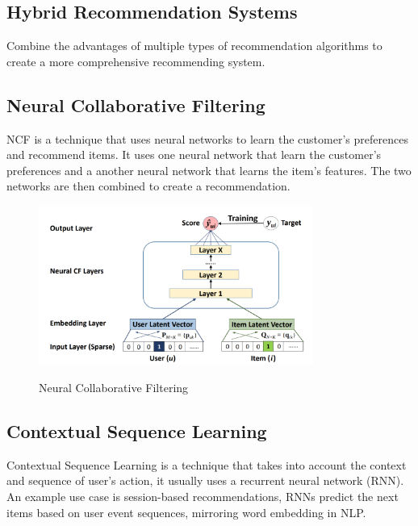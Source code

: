 \subsection{Hybrid Recommendation Systems}
Combine the advantages of multiple types of recommendation algorithms to create a more comprehensive recommending system.
\subsection{Neural Collaborative Filtering}
NCF is a technique that uses neural networks to learn the customer's preferences and recommend items. It uses one neural network that learn the customer's preferences and a another neural network that learns the item's features. The two networks are then combined to create a recommendation.
\begin{figure}[H]
    \centering
    \includegraphics[width=0.8\textwidth]{assets/neural-collaborative-filtering.png}
    \caption{Neural Collaborative Filtering}
    \label{fig:neural-collaborative-filtering}
    \cite{NvidiaRecSys}
\end{figure}

\subsection{Contextual Sequence Learning}
Contextual Sequence Learning is a technique that takes into account the context and sequence of user's action, it usually uses a recurrent neural network (RNN).
An example use case is session-based recommendations, RNNs predict the next items based on user event sequences, mirroring word embedding in NLP.
